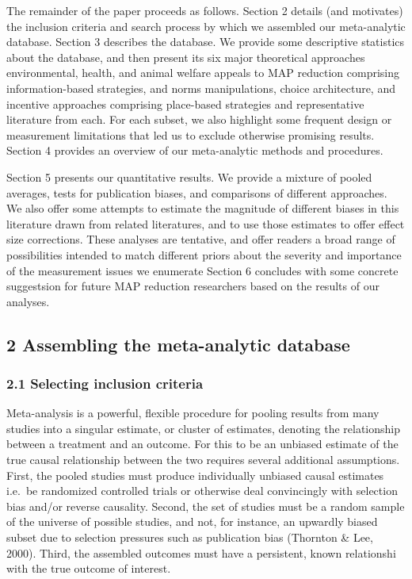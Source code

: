 \documentclass[
  man]{apa6}
\begin{document}
The remainder of the paper proceeds as follows. Section 2 details (and motivates) the inclusion criteria and search process by which we assembled our meta-analytic database. Section 3 describes the database. We provide some descriptive statistics about the database, and then present its six major theoretical approaches \textemdash environmental, health, and animal welfare appeals to MAP reduction comprising information-based strategies, and norms manipulations, choice architecture, and incentive approaches comprising place-based strategies \textemdash and representative literature from each. For each subset, we also highlight some frequent design or measurement limitations that led us to exclude otherwise promising results. Section 4 provides an overview of our meta-analytic methods and procedures.

Section 5 presents our quantitative results. We provide a mixture of pooled averages, tests for publication biases, and comparisons of different approaches. We also offer some attempts to estimate the magnitude of different biases in this literature drawn from related literatures, and to use those estimates to offer effect size corrections. These analyses are tentative, and offer readers a broad range of possibilities intended to match different priors about the severity and importance of the measurement issues we enumerate Section 6 concludes with some concrete suggestsion for future MAP reduction researchers based on the results of our analyses.

\subsection{2 Assembling the meta-analytic database}\label{assembling-the-meta-analytic-database}

\subsubsection{2.1 Selecting inclusion criteria}\label{selecting-inclusion-criteria}

Meta-analysis is a powerful, flexible procedure for pooling results from many studies into a singular estimate, or cluster of estimates, denoting the relationship between a treatment and an outcome. For this to be an unbiased estimate of the true causal relationship between the two requires several additional assumptions. First, the pooled studies must produce individually unbiased causal estimates i.e.~be randomized controlled trials or otherwise deal convincingly with selection bias and/or reverse causality. Second, the set of studies must be a random sample of the universe of possible studies, and not, for instance, an upwardly biased subset due to selection pressures such as publication bias (Thornton \& Lee, 2000). Third, the assembled outcomes must have a persistent, known relationshi with the true outcome of interest.
\end{document}
